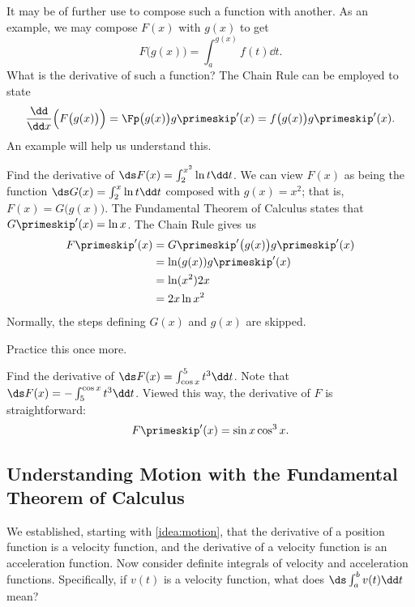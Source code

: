 It may be of further use to compose such a function with another. As an example, we may compose $F(x)$ with $g(x)$ to get
\[F\bigl(g(x)\bigr) = \int_a^{g(x)} f(t)\dd t.\]
What is the derivative of such a function? The Chain Rule can be employed to state
\[
\frac{\dd}{\dd x}\Bigl(F\bigl(g(x)\bigr)\Bigr) = \Fp\bigl(g(x)\bigr)g\primeskip'(x)
= f\bigl(g(x)\bigr)g\primeskip'(x).
\]
An example will help us understand this.

\begin{example}\label{ex_ftc11}%
Find the derivative of $\ds F(x) = \int_2^{x^2} \ln t\dd t$.
\solution
We can view $F(x)$ as being the function $\ds G(x) = \int_2^x \ln t\dd t$ composed with $g(x) = x^2$; that is, $F(x) = G\bigl(g(x)\bigr)$. The Fundamental Theorem of Calculus states that $G\primeskip'(x) = \ln x$. The Chain Rule gives us 
\begin{align*}
F\primeskip'(x) &= G\primeskip'\bigl(g(x)\bigr) g\primeskip'(x) \\
 			&= \ln (g(x)) g\primeskip'(x) \\
 			&= \ln (x^2) 2x \\
 			&=2x\ln x^2
\end{align*}
Normally, the steps defining $G(x)$ and $g(x)$ are skipped.
\end{example}

Practice this once more.

\begin{example}\label{ex_ftc12}%
Find the derivative of $\ds F(x) = \int_{\cos x}^5 t^3\dd t$.
\solution
Note that $\ds F(x) = -\int_5^{\cos x} t^3\dd t$. Viewed this way, the derivative of $F$ is straightforward:
\[F\primeskip'(x) = \sin x \cos^3 x.\]
\end{example}

\subsection{Understanding Motion with the Fundamental Theorem of Calculus}

We established, starting with \autoref{idea:motion}, that the derivative of a position function is a velocity function, and the derivative of a velocity function is an acceleration function. Now consider definite integrals of velocity and acceleration functions. Specifically, if $v(t)$ is a velocity function, what does $\ds \int_a^b v(t)\dd t$ mean?


